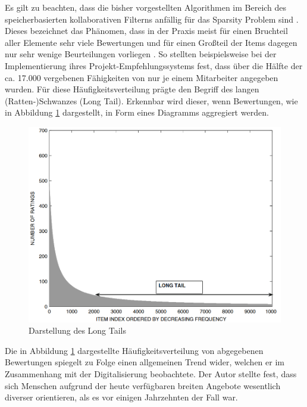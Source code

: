 Es gilt zu beachten, dass die bisher vorgestellten Algorithmen im Bereich des speicherbasierten kollaborativen Filterns anfällig für das Sparsity Problem sind \cite[S. 3f.]{grvcar:2006}. Dieses bezeichnet das Phänomen, dass in der Praxis meist für einen Bruchteil aller Elemente sehr viele Bewertungen und für einen Großteil der Items dagegen nur sehr wenige Beurteilungen vorliegen \cite[S. 8]{recommenderSystems:2016}. So stellten beispielsweise \textcite[S. 3]{mitre:2014} bei der Implementierung ihres Projekt-Empfehlungssystems fest, dass über die Hälfte der ca. 17.000 vergebenen Fähigkeiten von nur je einem Mitarbeiter angegeben wurden.
Für diese Häufigkeitsverteilung prägte \textcite[S. 12]{anderson:2007} den Begriff des langen (Ratten-)Schwanzes (Long Tail). Erkennbar wird dieser, wenn Bewertungen, wie in Abbildung \ref{fig:empfehlungssysteme:cf:speicherbasiert:abb1} dargestellt, in Form eines Diagramms aggregiert werden.

\begin{figure}[h]
	\centering
	\includegraphics[width=1\textwidth]{gfx/long-tail.png}
	\caption{Darstellung des Long Tails \cite[S. 33]{recommenderSystems:2016}}
	\label{fig:empfehlungssysteme:cf:speicherbasiert:abb1}
\end{figure}

Die in Abbildung \ref{fig:empfehlungssysteme:cf:speicherbasiert:abb1} dargestellte Häufigkeitsverteilung von abgegebenen Bewertungen spiegelt \textcite[S. 1ff.]{anderson:2007} zu Folge einen allgemeinen Trend wider, welchen er im Zusammenhang mit der Digitalisierung beobachtete. Der Autor stellte fest, dass sich Menschen aufgrund der heute verfügbaren breiten Angebote wesentlich diverser orientieren, als es vor einigen Jahrzehnten der Fall war.

